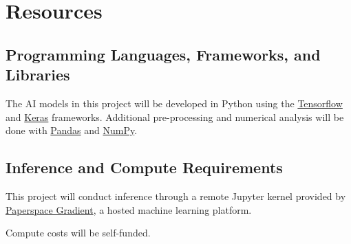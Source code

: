\chapter{Resources}


\section{Programming Languages, Frameworks, and Libraries}
The AI models in this project will be developed in Python using the \href{https://www.tensorflow.org/}{Tensorflow} and \href{https://keras.io/}{Keras} frameworks. Additional pre-processing and numerical analysis will be done with \href{https://pandas.pydata.org/}{Pandas} and \href{https://numpy.org/}{NumPy}. 

\section{Inference and Compute Requirements}
This project will conduct inference through a remote Jupyter kernel provided by \href{https://www.paperspace.com/}{Paperspace Gradient}, a hosted machine learning platform. 

\noindent
Compute costs will be self-funded.
